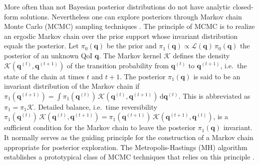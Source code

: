 More often than not Bayesian posterior distributions do not have analytic closed-form solutions.
Nevertheless one can explore posteriors through Markov chain Monte Carlo (MCMC) sampling techniques \cite{MCMC:Robert2004}.
The principle of MCMC is to realize an ergodic Markov chain over the prior support whose invariant distribution equals the posterior.
Let \(\pi_0(\bm{q})\) be the prior and \(\pi_1(\bm{q}) \propto \mathcal{L}(\bm{q}) \, \pi_0(\bm{q})\) the posterior of an unknown QoI \(\bm{q}\).
The Markov kernel \(\mathcal{K}\) defines the density \(\mathcal{K}(\bm{q}^{(t)},\bm{q}^{(t+1)})\) of the transition probability from \(\bm{q}^{(t)}\) to \(\bm{q}^{(t+1)}\),
i.e.\ the state of the chain at times \(t\) and \(t+1\).
The posterior \(\pi_1(\bm{q})\) is said to be an invariant distribution of the Markov chain if \(\pi_1(\bm{q}^{(t+1)}) = \int \pi_1(\bm{q}^{(t)}) \, \mathcal{K}(\bm{q}^{(t)},\bm{q}^{(t+1)}) \, \mathrm{d} \bm{q}^{(t)}\).
This is abbreviated as \(\pi_1 = \pi_1 \mathcal{K}\).
Detailed balance, i.e.\ time reversibility \(\pi_1(\bm{q}^{(t)}) \, \mathcal{K}(\bm{q}^{(t)},\bm{q}^{(t+1)}) = \pi_1(\bm{q}^{(t+1)}) \, \mathcal{K}(\bm{q}^{(t+1)},\bm{q}^{(t)})\),
is a sufficient condition for the Markov chain to leave the posterior \(\pi_1(\bm{q})\) invariant.
It normally serves as the guiding principle for the construction of a Markov chain appropriate for posterior exploration.
The Metropolis-Hastings (MH) algorithm establishes a prototypical class of MCMC techniques that relies on this principle \cite{MCMC:Metropolis1953,MCMC:Hastings1970}.

